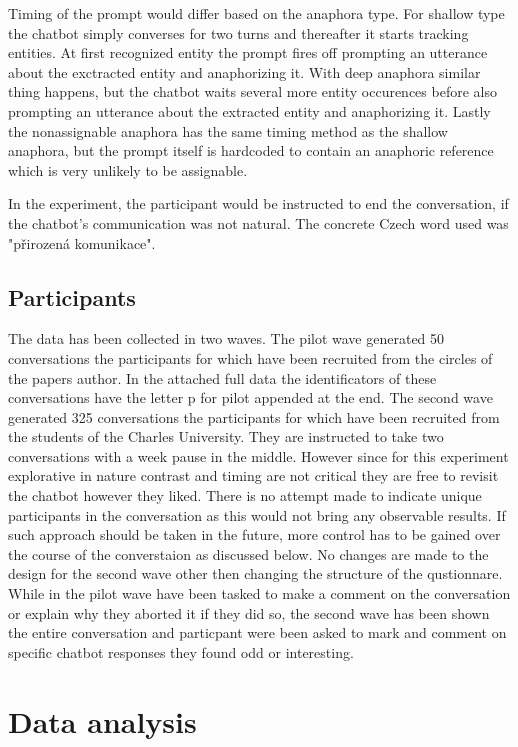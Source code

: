 \documentclass[12pt]{report}
\begin{document}
{Timing of the prompt would differ based on the anaphora type.
For shallow type the chatbot simply converses for two turns and thereafter it starts tracking entities.
At first recognized entity the prompt fires off
prompting an utterance about the exctracted entity and anaphorizing it.
With deep anaphora similar thing happens,
but the chatbot waits several more entity occurences
before also prompting an utterance about the extracted entity and anaphorizing it.
Lastly the nonassignable anaphora has the same timing method as the shallow anaphora,
but the prompt itself is hardcoded to contain an anaphoric reference which is
very unlikely to be assignable.

In the experiment, the participant would be instructed to end the conversation,
if the chatbot's communication was not natural.
The concrete Czech word used was "přirozená komunikace".

\subsection{Participants}
The data has been collected in two waves.
The pilot wave generated 50 conversations
the participants for which have been recruited from the circles of the papers author.
In the attached full data
the identificators of these conversations have
the letter p for pilot appended at the end.
The second wave generated 325 conversations
the participants for which have been recruited from the students of the Charles University.
They are instructed to take two conversations with a week pause in the middle.
However since for this experiment explorative in nature contrast and timing are not critical
they are free to revisit the chatbot however they liked.
There is no attempt made to indicate unique participants in the conversation as
this would not bring any observable results.
If such approach should be taken in the future,
more control has to be gained over the course of the converstaion
as discussed below.
No changes are made to the design for the second wave other then changing the structure of the qustionnare.
While in the pilot wave have been tasked to make a comment on the conversation or
explain why they aborted it if they did so,
the second wave has been shown the entire conversation
and particpant were been asked to mark and comment on specific chatbot responses they found odd or interesting.

\section{Data analysis}

}
\end{document}
